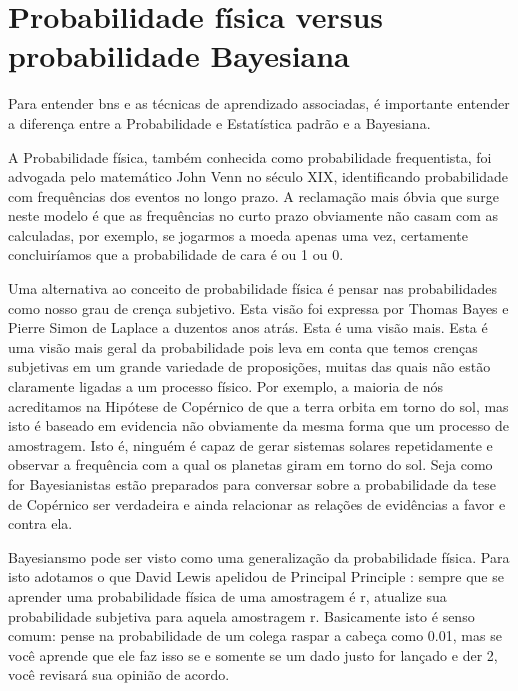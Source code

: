 \section{Probabilidade física versus probabilidade Bayesiana}
Para entender \glspl{bn} e as técnicas de aprendizado associadas, é importante entender a diferença entre a Probabilidade e Estatística padrão e a Bayesiana.


A Probabilidade física, também conhecida como probabilidade frequentista, foi advogada pelo matemático John Venn \cite{ven66} no século XIX, identificando probabilidade com frequências dos eventos no longo prazo. A reclamação mais óbvia que surge neste modelo é que as frequências no curto prazo obviamente não casam com as calculadas, por exemplo, se jogarmos a moeda apenas uma vez, certamente concluiríamos que a probabilidade de cara é ou 1 ou 0.

Uma alternativa ao conceito de probabilidade física é pensar nas probabilidades como nosso grau de crença subjetivo. Esta visão foi expressa por Thomas Bayes \cite{bayes63} e Pierre Simon de Laplace \cite{laplace12} a duzentos anos atrás. Esta é uma visão mais. Esta é uma visão mais geral da probabilidade pois leva em conta que temos crenças subjetivas em um grande variedade de proposições, muitas das quais não estão claramente ligadas a um processo físico.  Por exemplo, a maioria de nós acreditamos na Hipótese de Copérnico de que a terra orbita em torno do sol, mas isto é baseado em evidencia não obviamente da mesma forma que um processo de amostragem. Isto é, ninguém é capaz de gerar sistemas solares repetidamente e observar a frequência com a qual os planetas giram em torno do sol. Seja como for Bayesianistas estão preparados para conversar sobre a probabilidade da tese de Copérnico ser verdadeira e ainda relacionar as relações de evidências a favor e contra ela. 

Bayesiansmo pode ser visto como uma generalização da probabilidade física. Para isto adotamos o que David Lewis apelidou de Principal Principle \cite{lewis80}: sempre que se aprender uma probabilidade física de uma amostragem é r, atualize sua probabilidade subjetiva para aquela amostragem r. Basicamente isto é senso comum: pense na probabilidade de um colega raspar a cabeça como 0.01, mas se você aprende que ele faz isso se e somente se um dado justo for lançado e der 2, você revisará sua opinião de acordo.

